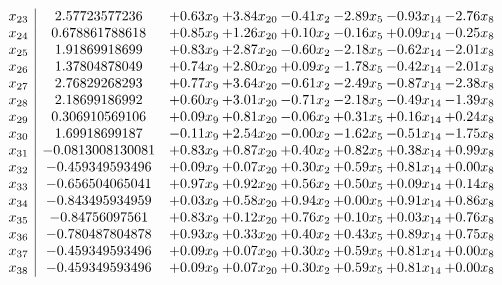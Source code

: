 \documentclass[8pt]{article}
\begin{document}
\[\begin{array}{c| c c@{\hskip 2pt} c@{\hskip 2pt} c@{\hskip 2pt} c@{\hskip 2pt} c@{\hskip 2pt} c@{\hskip 2pt} }
 x_{23}   &  2.57723577236 & +  0.63 x_{9} & +  3.84 x_{20} & -0.41 x_{2} & -2.89 x_{5} & -0.93 x_{14} & -2.76 x_{8}\\
 x_{24}   &  0.678861788618 & +  0.85 x_{9} & +  1.26 x_{20} & +  0.10 x_{2} & -0.16 x_{5} & +  0.09 x_{14} & -0.25 x_{8}\\
 x_{25}   &  1.91869918699 & +  0.83 x_{9} & +  2.87 x_{20} & -0.60 x_{2} & -2.18 x_{5} & -0.62 x_{14} & -2.01 x_{8}\\
 x_{26}   &  1.37804878049 & +  0.74 x_{9} & +  2.80 x_{20} & +  0.09 x_{2} & -1.78 x_{5} & -0.42 x_{14} & -2.01 x_{8}\\
 x_{27}   &  2.76829268293 & +  0.77 x_{9} & +  3.64 x_{20} & -0.61 x_{2} & -2.49 x_{5} & -0.87 x_{14} & -2.38 x_{8}\\
 x_{28}   &  2.18699186992 & +  0.60 x_{9} & +  3.01 x_{20} & -0.71 x_{2} & -2.18 x_{5} & -0.49 x_{14} & -1.39 x_{8}\\
 x_{29}   &  0.306910569106 & +  0.09 x_{9} & +  0.81 x_{20} & -0.06 x_{2} & +  0.31 x_{5} & +  0.16 x_{14} & +  0.24 x_{8}\\
 x_{30}   &  1.69918699187 & -0.11 x_{9} & +  2.54 x_{20} & -0.00 x_{2} & -1.62 x_{5} & -0.51 x_{14} & -1.75 x_{8}\\
 x_{31}   &  -0.0813008130081 & +  0.83 x_{9} & +  0.87 x_{20} & +  0.40 x_{2} & +  0.82 x_{5} & +  0.38 x_{14} & +  0.99 x_{8}\\
 x_{32}   &  -0.459349593496 & +  0.09 x_{9} & +  0.07 x_{20} & +  0.30 x_{2} & +  0.59 x_{5} & +  0.81 x_{14} & +  0.00 x_{8}\\
 x_{33}   &  -0.656504065041 & +  0.97 x_{9} & +  0.92 x_{20} & +  0.56 x_{2} & +  0.50 x_{5} & +  0.09 x_{14} & +  0.14 x_{8}\\
 x_{34}   &  -0.843495934959 & +  0.03 x_{9} & +  0.58 x_{20} & +  0.94 x_{2} & +  0.00 x_{5} & +  0.91 x_{14} & +  0.86 x_{8}\\
 x_{35}   &  -0.84756097561 & +  0.83 x_{9} & +  0.12 x_{20} & +  0.76 x_{2} & +  0.10 x_{5} & +  0.03 x_{14} & +  0.76 x_{8}\\
 x_{36}   &  -0.780487804878 & +  0.93 x_{9} & +  0.33 x_{20} & +  0.40 x_{2} & +  0.43 x_{5} & +  0.89 x_{14} & +  0.75 x_{8}\\
 x_{37}   &  -0.459349593496 & +  0.09 x_{9} & +  0.07 x_{20} & +  0.30 x_{2} & +  0.59 x_{5} & +  0.81 x_{14} & +  0.00 x_{8}\\
 x_{38}   &  -0.459349593496 & +  0.09 x_{9} & +  0.07 x_{20} & +  0.30 x_{2} & +  0.59 x_{5} & +  0.81 x_{14} & +  0.00 x_{8}\\

\end{array}\]
\end{document}
